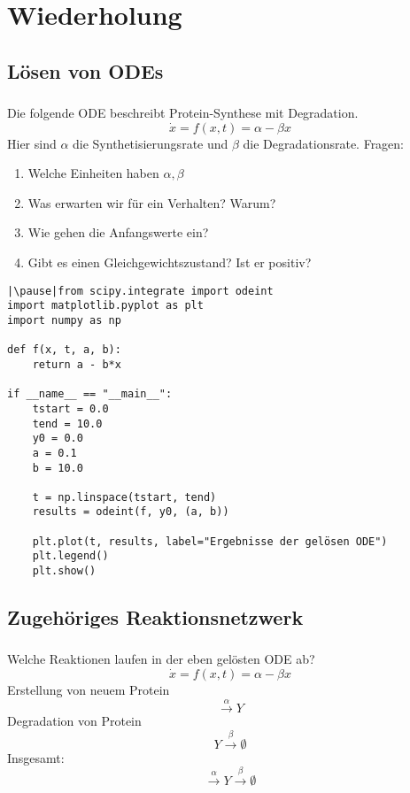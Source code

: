 \section{Wiederholung}
\label{sec:recap}

\subsection{Lösen von ODEs}
\begin{frame}
    \frametitle{\insertsubsection}
    Die folgende ODE beschreibt Protein-Synthese mit Degradation.
    \[\dot{x} = f(x, t) = \alpha - \beta x\]
    Hier sind $\alpha$ die Synthetisierungsrate und $\beta$ die Degradationsrate.
    \pause Fragen:
    \begin{enumerate}[<+->]
        \item Welche Einheiten haben $\alpha,\beta$
        \item Was erwarten wir für ein Verhalten? Warum?
        \item Wie gehen die Anfangswerte ein?
        \item Gibt es einen Gleichgewichtszustand? Ist er positiv?
    \end{enumerate}
\end{frame}


\begin{frame}[fragile]
    \begin{verbatim}
|\pause|from scipy.integrate import odeint
import matplotlib.pyplot as plt
import numpy as np

def f(x, t, a, b):
    return a - b*x

if __name__ == "__main__":
    tstart = 0.0
    tend = 10.0
    y0 = 0.0
    a = 0.1
    b = 10.0
    
    t = np.linspace(tstart, tend)
    results = odeint(f, y0, (a, b))

    plt.plot(t, results, label="Ergebnisse der gelösen ODE")
    plt.legend()
    plt.show()
    \end{verbatim}
\end{frame}


\subsection{Zugehöriges Reaktionsnetzwerk}
\begin{frame}[fragile]
    \frametitle{\insertsubsection}
    Welche Reaktionen laufen in der eben gelösten ODE ab?
    \[\dot{x} = f(x, t) = \alpha - \beta x\]
    \pause Erstellung von neuem Protein
    \[\xrightarrow{\alpha} Y\]
    \pause Degradation von Protein
    \[Y \xrightarrow{\beta}\emptyset\]
    \pause Insgesamt:
    \[\xrightarrow{\alpha} Y \xrightarrow{\beta}\emptyset\]
\end{frame}


